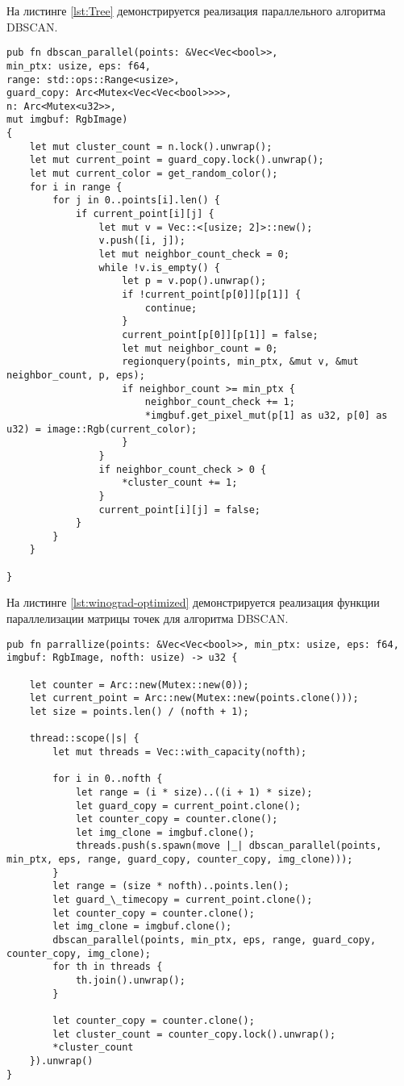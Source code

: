 На листинге \ref{lst:Tree} демонстрируется реализация параллельного алгоритма DBSCAN.

\newpage

\begin{lstlisting}[label=lst:Tree,caption=Реализация параллельного алгоритма DBSCAN]
pub fn dbscan_parallel(points: &Vec<Vec<bool>>, 
min_ptx: usize, eps: f64, 
range: std::ops::Range<usize>, 
guard_copy: Arc<Mutex<Vec<Vec<bool>>>>, 
n: Arc<Mutex<u32>>,
mut imgbuf: RgbImage) 
{
	let mut cluster_count = n.lock().unwrap();
	let mut current_point = guard_copy.lock().unwrap();
	let mut current_color = get_random_color();
	for i in range {
		for j in 0..points[i].len() {
			if current_point[i][j] {
				let mut v = Vec::<[usize; 2]>::new();
				v.push([i, j]);
				let mut neighbor_count_check = 0;
				while !v.is_empty() {
					let p = v.pop().unwrap();
					if !current_point[p[0]][p[1]] {
						continue;
					}
					current_point[p[0]][p[1]] = false;
					let mut neighbor_count = 0;
					regionquery(points, min_ptx, &mut v, &mut neighbor_count, p, eps);
					if neighbor_count >= min_ptx {
						neighbor_count_check += 1;
						*imgbuf.get_pixel_mut(p[1] as u32, p[0] as u32) = image::Rgb(current_color);
					}
				}
				if neighbor_count_check > 0 {
					*cluster_count += 1;
				}
				current_point[i][j] = false;
			}
		}
	}
	
}
\end{lstlisting}	

\newpage
На листинге \ref{lst:winograd-optimized} демонстрируется реализация функции параллелизации матрицы точек для алгоритма DBSCAN.
\begin{lstlisting}[label=lst:winograd-optimized,caption=Реализация функции параллелизации матрицы точек]
pub fn parrallize(points: &Vec<Vec<bool>>, min_ptx: usize, eps: f64, imgbuf: RgbImage, nofth: usize) -> u32 {
	
	let counter = Arc::new(Mutex::new(0));
	let current_point = Arc::new(Mutex::new(points.clone()));
	let size = points.len() / (nofth + 1);
	
	thread::scope(|s| {
		let mut threads = Vec::with_capacity(nofth);
		
		for i in 0..nofth {
			let range = (i * size)..((i + 1) * size);
			let guard_copy = current_point.clone();
			let counter_copy = counter.clone();
			let img_clone = imgbuf.clone();
			threads.push(s.spawn(move |_| dbscan_parallel(points, min_ptx, eps, range, guard_copy, counter_copy, img_clone)));
		}
		let range = (size * nofth)..points.len();
		let guard_\_timecopy = current_point.clone();
		let counter_copy = counter.clone();
		let img_clone = imgbuf.clone();
		dbscan_parallel(points, min_ptx, eps, range, guard_copy, counter_copy, img_clone);
		for th in threads {
			th.join().unwrap();
		}
		
		let counter_copy = counter.clone();
		let cluster_count = counter_copy.lock().unwrap();
		*cluster_count
	}).unwrap()
}
\end{lstlisting}	

